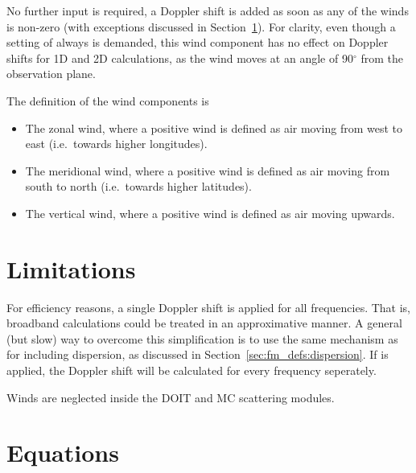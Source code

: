 No further input is required, a Doppler shift is added as soon as any of the
winds is non-zero (with exceptions discussed in
Section~\ref{sec:winds:limitations}). For clarity, even though a setting of
 always is demanded, this wind component has no
effect on Doppler shifts for 1D and 2D calculations, as the wind moves at an
angle of 90$^\circ$ from the observation plane.

The definition of the wind components is
\begin{itemize}
\item[\WindWE] The zonal wind, where a positive wind is defined as air moving
  from west to east (i.e.\ towards higher longitudes).
\item[\WindSN] The meridional wind, where a positive wind is defined as air
  moving from south to north (i.e.\ towards higher latitudes).
\item[\WindVe] The vertical wind, where a positive wind is defined as air
  moving upwards.
\end{itemize}



\section{Limitations}
\label{sec:winds:limitations}
%
For efficiency reasons, a single Doppler shift is applied for all frequencies.
That is, broadband calculations could be treated in an approximative manner. A
general (but slow) way to overcome this simplification is to use the same
mechanism as for including dispersion, as discussed in
Section~\ref{sec:fm_defs:dispersion}. If  is
applied, the Doppler shift will be calculated for every frequency seperately.

Winds are neglected inside the DOIT and MC scattering modules.



\section{Equations}
\label{sec:winds:eqs}

